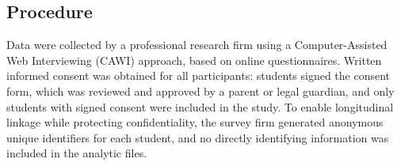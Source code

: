 \documentclass[
  11pt,
]{article}
\begin{document}
\begin{table}[H]

\caption{\label{tbl-cohort}Descriptive statistics for cohort level}


\end{table}%

\subsection{Procedure}\label{procedure}

Data were collected by a professional research firm using a
Computer-Assisted Web Interviewing (CAWI) approach, based on online
questionnaires. Written informed consent was obtained for all
participants: students signed the consent form, which was reviewed and
approved by a parent or legal guardian, and only students with signed
consent were included in the study. To enable longitudinal linkage while
protecting confidentiality, the survey firm generated anonymous unique
identifiers for each student, and no directly identifying information
was included in the analytic files.
\end{document}
